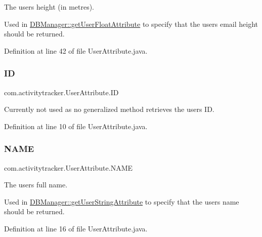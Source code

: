 The user\textquotesingle{}s height (in metres).

Used in \mbox{\hyperlink{classcom_1_1activitytracker_1_1_d_b_manager_a98df66254bec4d74b29cfe468a9fc794}{D\+B\+Manager\+::get\+User\+Float\+Attribute}} to specify that the user\textquotesingle{}s email height should be returned. 

Definition at line 42 of file User\+Attribute.\+java.

\mbox{\label{enumcom_1_1activitytracker_1_1_user_attribute_a82c5680d15b629e939afcd98a39abf76}} 
\subsubsection{\texorpdfstring{ID}{ID}}
{\footnotesize\ttfamily com.\+activitytracker.\+User\+Attribute.\+ID}

Currently not used as no generalized method retrieves the user\textquotesingle{}s ID. 

Definition at line 10 of file User\+Attribute.\+java.

\mbox{\label{enumcom_1_1activitytracker_1_1_user_attribute_aac51a5dfcaaa9e5304d37d74fc888af4}} 
\subsubsection{\texorpdfstring{N\+A\+ME}{NAME}}
{\footnotesize\ttfamily com.\+activitytracker.\+User\+Attribute.\+N\+A\+ME}

The user\textquotesingle{}s full name.

Used in \mbox{\hyperlink{classcom_1_1activitytracker_1_1_d_b_manager_a20f726c054d6c8a6fc3ce629d87f1114}{D\+B\+Manager\+::get\+User\+String\+Attribute}} to specify that the user\textquotesingle{}s name should be returned. 

Definition at line 16 of file User\+Attribute.\+java.

\mbox{\label{enumcom_1_1activitytracker_1_1_user_attribute_aa893eac0362a28e73a599ce1ba141d40}} 
